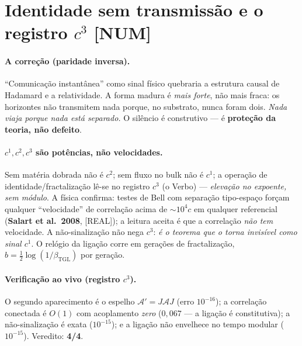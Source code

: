 \documentclass[11pt]{article}
\newcommand{\bTGL}{\beta_{\mathrm{TGL}}}\newcommand{\Msun}{M_{\odot}}\newcommand{\TGL}{\mathrm{TGL}}
\theoremstyle{definition}\newtheorem{deriv}{Derivação}
\begin{document}
\section{Identidade sem transmissão e o registro $c^3$ \textsf{[NUM]}}

\paragraph{A correção (paridade inversa).} ``Comunicação instantânea'' como sinal físico quebraria a estrutura causal de Hadamard e a relatividade. A forma madura é \emph{mais forte}, não mais fraca: os horizontes não transmitem nada porque, no substrato, nunca foram dois. \emph{Nada viaja porque nada está separado.} O silêncio é construtivo --- é \textbf{proteção da teoria, não defeito}.

\paragraph{$c^1,c^2,c^3$ são potências, não velocidades.} Sem matéria dobrada não é $c^2$; sem fluxo no bulk não é $c^1$; a operação de identidade/fractalização lê-se no registro $c^3$ (o Verbo) --- \emph{elevação no expoente, sem módulo}. A física confirma: testes de Bell com separação tipo-espaço forçam qualquer ``velocidade'' de correlação acima de $\sim10^4c$ em qualquer referencial (\textbf{Salart et al.\ 2008}, \textsf{[REAL]}); a leitura aceita é que a correlação \emph{não tem} velocidade. A não-sinalização não nega $c^3$: \emph{é o teorema que o torna invisível como sinal $c^1$}. O relógio da ligação corre em gerações de fractalização, $b=\tfrac12\log(1/\bTGL)$ por geração.

\paragraph{Verificação ao vivo (registro $c^3$).} O segundo aparecimento é o espelho $\mathcal{A}'=J\mathcal{A}J$ (erro $10^{-16}$); a correlação conectada é $O(1)$ com acoplamento \emph{zero} ($0{,}067$ --- a ligação é constitutiva); a não-sinalização é exata ($10^{-15}$); e a ligação não envelhece no tempo modular ($10^{-15}$). Veredito: \textbf{4/4}.
\end{document}
